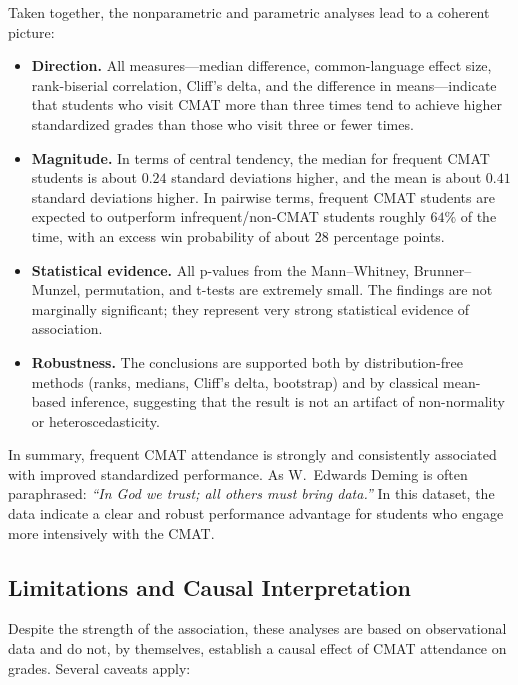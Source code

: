 \documentclass[8pt,a4paper]{article} %
\numberwithin{figure}{subsection}
\begin{document}
Taken together, the nonparametric and parametric analyses lead to a
coherent picture:
\begin{itemize}
  \item \textbf{Direction.} All measures---median difference, common-language
        effect size, rank-biserial correlation, Cliff's delta, and
        the difference in means---indicate that students who visit
        CMAT more than three times tend to achieve higher
        standardized grades than those who visit three or fewer
        times.
  \item \textbf{Magnitude.} In terms of central tendency, the median
        for frequent CMAT students is about $0.24$ standard
        deviations higher, and the mean is about $0.41$ standard
        deviations higher. In pairwise terms, frequent CMAT
        students are expected to outperform infrequent/non-CMAT
        students roughly $64\%$ of the time, with an excess win
        probability of about $28$ percentage points.
  \item \textbf{Statistical evidence.} All p-values from the Mann--Whitney,
        Brunner--Munzel, permutation, and t-tests are extremely
        small. The findings are not marginally significant; they
        represent very strong statistical evidence of association.
  \item \textbf{Robustness.} The conclusions are supported both by
        distribution-free methods (ranks, medians, Cliff's delta,
        bootstrap) and by classical mean-based inference, suggesting
        that the result is not an artifact of non-normality or
        heteroscedasticity.
\end{itemize}

In summary, frequent CMAT attendance is strongly and consistently
associated with improved standardized performance. As W.~Edwards
Deming is often paraphrased: \emph{``In God we trust; all others
must bring data.''} In this dataset, the data indicate a clear and
robust performance advantage for students who engage more
intensively with the CMAT.

\subsection{Limitations and Causal Interpretation}

Despite the strength of the association, these analyses are based
on observational data and do not, by themselves, establish a causal
effect of CMAT attendance on grades. Several caveats apply:
\end{document}

